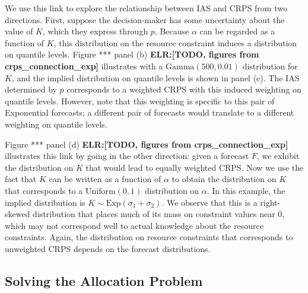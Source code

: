 \documentclass{article}
\def\elr#1{{\color{cyan}\textbf{ELR:[#1]}}}
\begin{document}
We use this link to explore the relationship between IAS and CRPS from two directions. First, suppose the decision-maker has some uncertainty about the value of $K$, which they express through $p$. Because $\alpha$ can be regarded as a function of $K$, this distribution on the resource constraint induces a distribution on quantile levels. Figure *** panel (b) \elr{TODO, figures from crps\_connection\_exp} illustrates with a $\text{Gamma}(500, 0.01)$ distribution for $K$, and the implied distribution on quantile levels is shown in panel (c). The IAS determined by $p$ corresponds to a weighted CRPS with this induced weighting on quantile levels. However, note that this weighting is specific to this pair of Exponential forecasts; a different pair of forecasts would translate to a different weighting on quantile levels.

Figure *** panel (d) \elr{TODO, figures from crps\_connection\_exp} illustrates this link by going in the other direction: given a forecast $F$, we exhibit the distribution on $K$ that would lead to equally weighted CRPS. Now we use the fact that $K$ can be written as a function of $\alpha$ to obtain the distribution on $K$ that corresponds to a $\text{Uniform}(0,1)$ distribution on $\alpha$. In this example, the implied distribution is $K \sim \text{Exp}(\sigma_1 + \sigma_2)$. We observe that this is a right-skewed distribution that places much of its mass on constraint values near 0, which may not correspond well to actual knowledge about the resource constraints. Again, the distribution on resource constraints that corresponds to unweighted CRPS depends on the forecast distributions.

\subsection{Solving the Allocation Problem}
\end{document}
